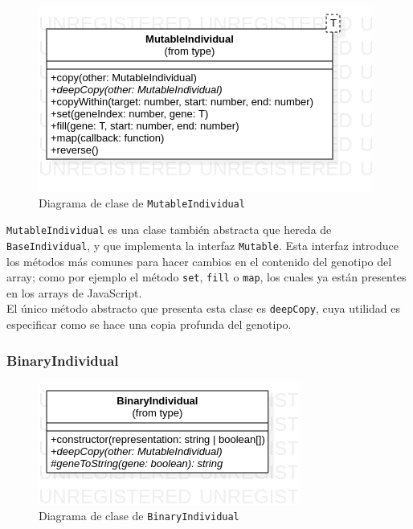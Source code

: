 \begin{figure}[ht]
    \centering
    \includegraphics[scale=0.6]{mem/images/cap-4/4.2.2(Individuos)/MutableIndividual.png}
    \caption{Diagrama de clase de \texttt{MutableIndividual}}
    \label{fig:mutableindividual-uml}
\end{figure}

\texttt{MutableIndividual} es una clase también abstracta que hereda de \texttt{BaseIndividual}, y que implementa la interfaz \texttt{Mutable}. Esta interfaz introduce los métodos más comunes para hacer cambios en el contenido del genotipo del array; como por ejemplo el método \texttt{set}, \texttt{fill} o \texttt{map}, los cuales ya están presentes en los arrays de JavaScript. \\

El único método abstracto que presenta esta clase es \texttt{deepCopy}, cuya utilidad es especificar como se hace una copia profunda del genotipo.

\subsubsection{BinaryIndividual}

\begin{figure}[ht]
    \centering
    \includegraphics[scale=0.7]{mem/images/cap-4/4.2.2(Individuos)/BinaryIndividual.png}
    \caption{Diagrama de clase de \texttt{BinaryIndividual}}
    \label{fig:binaryindividual-uml}
\end{figure}

